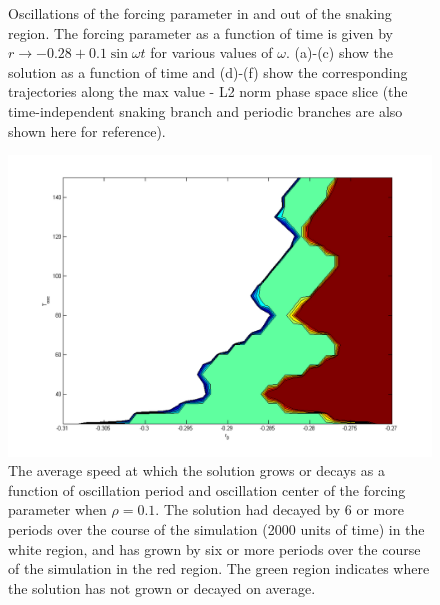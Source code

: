 \documentclass[pre,preprint,superscriptaddress]{revtex4-1}
\begin{document}
\begin{figure}[!htb]
\begin{center}
{}
    \caption{Oscillations of the forcing parameter in and out of the snaking region.  The forcing parameter as a function of time is given by $r\rightarrow -0.28+ 0.1\sin\omega t$ for various values of $\omega$. (a)-(c) show the solution as a function of time and (d)-(f) show the corresponding trajectories along the max value - L2 norm phase space slice (the time-independent snaking branch and periodic branches are also shown here for reference). }
    \label{fig:OscOutSnake}
  \end{center}
\end{figure}


\begin{figure}[!htb]\center
\includegraphics[width=120mm]{Vcm01.png}
\caption{The average speed at which the solution grows or decays as a function of oscillation period and oscillation center of the forcing parameter when $\rho=0.1$.  The solution had decayed by 6 or more periods over the course of the simulation (2000 units of time) in the white region, and has grown by six or more periods over the course of the simulation  in the red region.  The green region indicates where the solution has not grown or decayed on average.}
    \label{fig:Vcm01}
\end{figure}
\end{document}

